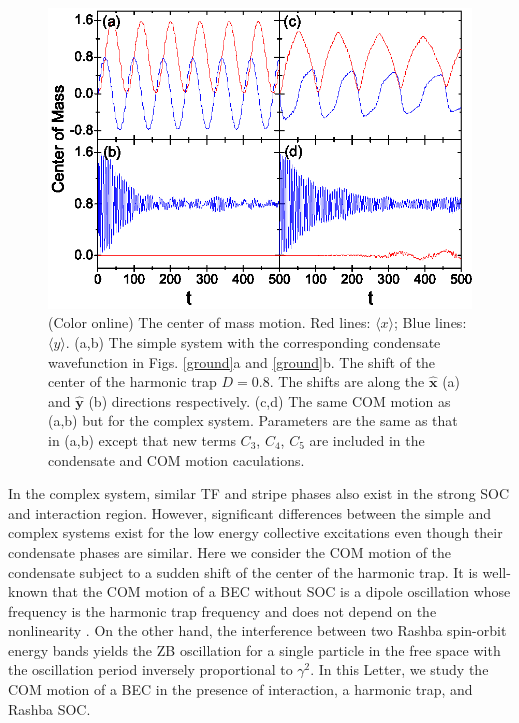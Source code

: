 \documentclass[prl,twocolumn,showpacs,floatfix]{revtex4}
\begin{document}
\begin{figure}[b]
\includegraphics[width=1\linewidth]{Fig3.eps} \vspace{-10pt}
\caption{(Color online) The center of mass motion. Red lines: $\langle
x\rangle $; Blue lines: $\langle y\rangle $. (a,b) The simple system with
the corresponding condensate wavefunction in Figs. \protect\ref{ground}a and
\protect\ref{ground}b. The shift of the center of the harmonic trap $D=0.8$.
The shifts are along the $\mathbf{\hat{x}}$ (a) and $\mathbf{\hat{y}}$ (b)
directions respectively. (c,d) The same COM motion as (a,b) but for the
complex system. Parameters are the same as that in (a,b) except that new
terms $C_{3}$, $C_{4}$, $C_{5}$ are included in the condensate and COM
motion caculations.}
\label{COM}
\end{figure}

In the complex system, similar TF and stripe phases also exist in the strong
SOC and interaction region. However, significant differences between the
simple and complex systems exist for the low energy collective excitations
even though their condensate phases are similar. Here we consider the COM
motion of the condensate subject to a sudden shift of the center of the
harmonic trap. It is well-known that the COM motion of a BEC without SOC is
a dipole oscillation whose frequency is the harmonic trap frequency and does
not depend on the nonlinearity \cite{Stringari}. On the other hand, the
interference between two Rashba spin-orbit energy bands yields the ZB
oscillation \cite{Vaishnav} for a single particle in the free space with the
oscillation period inversely proportional to $\gamma ^{2}$. In this Letter,
we study the COM motion of a BEC in the presence of interaction, a harmonic
trap, and Rashba SOC.
\end{document}
